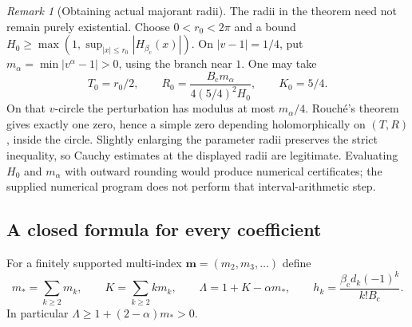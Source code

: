 \documentclass[11pt,a4paper]{article}
\numberwithin{equation}{section}
\theoremstyle{definition}
\theoremstyle{remark}
\newtheorem{remark}[theorem]{Remark}
\newcommand{\bc}{\beta_{\mathrm c}}
\newcommand{\Bc}{B_{\mathrm c}}
\newcommand{\m}{\boldsymbol m}
\begin{document}
\begin{remark}[Obtaining actual majorant radii]
The radii in the theorem need not remain purely existential. Choose
$0<r_0<2\pi$ and a bound $H_0\ge\max(1,\sup_{|x|\le r_0}|H_{\bc}(x)|)$.
On $|v-1|=1/4$, put $m_\alpha=\min|v^\alpha-1|>0$, using the branch
near $1$. One may take
\[
 T_0=r_0/2,\qquad
 R_0=\frac{\Bc m_\alpha}{4(5/4)^2H_0},\qquad K_0=5/4.
\]
On that $v$-circle the perturbation has modulus at most $m_\alpha/4$.
Rouch\'e's theorem gives exactly one zero, hence a simple zero depending
holomorphically on $(T,R)$, inside the circle. Slightly enlarging the
parameter radii preserves the strict inequality, so Cauchy estimates at
the displayed radii are legitimate. Evaluating $H_0$ and $m_\alpha$ with
outward rounding would produce numerical certificates; the supplied
numerical program does not perform that interval-arithmetic step.
\end{remark}

\subsection{A closed formula for every coefficient}
For a finitely supported multi-index $\m=(m_2,m_3,\ldots)$ define
\begin{equation}\label{eq:multiindex}
 m_* =\sum_{k\ge2}m_k,\qquad
 K=\sum_{k\ge2}k m_k,\qquad
 \Lambda=1+K-\alpha m_*,\qquad
 h_k=\frac{\bc d_k(-1)^k}{k!\Bc}.
\end{equation}
In particular $\Lambda\ge1+(2-\alpha)m_*>0$.
\end{document}
